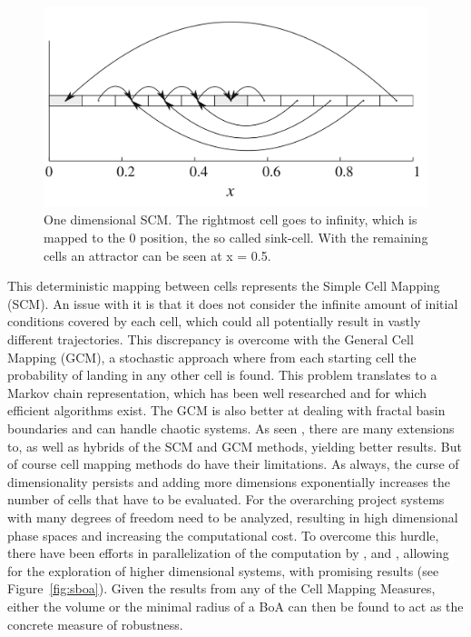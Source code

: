 \begin{figure}[h]
    
    \centering
    \includegraphics[width=.5\linewidth]{figures/1d-cm.jpg}
    \caption[One dimensional SCM]{One dimensional SCM. The rightmost cell goes to infinity, which is mapped to the 0 position, the so called sink-cell. With the remaining cells an attractor can be seen at x = 0.5. \cite{cell1}}
    \label{fig:1d-cm}
\end{figure}

This deterministic mapping between cells represents the Simple Cell Mapping (SCM). An issue with it is that it does not consider the infinite amount of initial conditions covered by each cell, which could all potentially result in vastly different trajectories. This discrepancy is overcome with the General Cell Mapping (GCM), a stochastic approach where from each starting cell the probability of landing in any other cell is found. This problem translates to a Markov chain representation, which has been well researched and for which efficient algorithms exist. The GCM is also better at dealing with fractal basin boundaries and can handle chaotic systems. As seen \cite{cell2}, there are many extensions to, as well as hybrids of the SCM and GCM methods, yielding better results. But of course cell mapping methods do have their limitations. 
As always, the curse of dimensionality persists and adding more dimensions exponentially increases the number of cells that have to be evaluated. For the overarching project systems with many degrees of freedom need to be analyzed, resulting in high dimensional phase spaces and increasing the computational cost. To overcome this hurdle, there have been efforts in parallelization of the computation by \cite{sixdim},\cite{parallel} and \cite{integr}, allowing for the exploration of higher dimensional systems, with promising results (see Figure~\ref{fig:sboa}). Given the results from any of the Cell Mapping Measures, either the volume or the minimal radius of a BoA can then be found to act as the concrete measure of robustness. 

